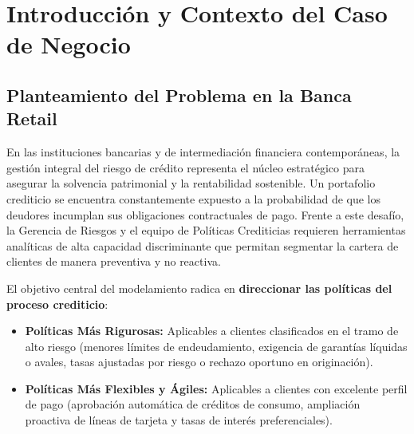 \documentclass[11pt,a4paper]{article}
\begin{document}
\vspace{0.5cm}

\tableofcontents
\newpage
\listoffigures
\vspace{0.5cm}
\listoftables
\newpage
{}

\section{Introducción y Contexto del Caso de Negocio}

\subsection{Planteamiento del Problema en la Banca Retail}
En las instituciones bancarias y de intermediación financiera contemporáneas, la gestión integral del riesgo de crédito representa el núcleo estratégico para asegurar la solvencia patrimonial y la rentabilidad sostenible. Un portafolio crediticio se encuentra constantemente expuesto a la probabilidad de que los deudores incumplan sus obligaciones contractuales de pago. Frente a este desafío, la Gerencia de Riesgos y el equipo de Políticas Crediticias requieren herramientas analíticas de alta capacidad discriminante que permitan segmentar la cartera de clientes de manera preventiva y no reactiva.

El objetivo central del modelamiento radica en \textbf{direccionar las políticas del proceso crediticio}:
\begin{itemize}[leftmargin=1.5cm]
    \item \textbf{Políticas Más Rigurosas:} Aplicables a clientes clasificados en el tramo de alto riesgo (menores límites de endeudamiento, exigencia de garantías líquidas o avales, tasas ajustadas por riesgo o rechazo oportuno en originación).
    \item \textbf{Políticas Más Flexibles y Ágiles:} Aplicables a clientes con excelente perfil de pago (aprobación automática de créditos de consumo, ampliación proactiva de líneas de tarjeta y tasas de interés preferenciales).
\end{itemize}
\end{document}
